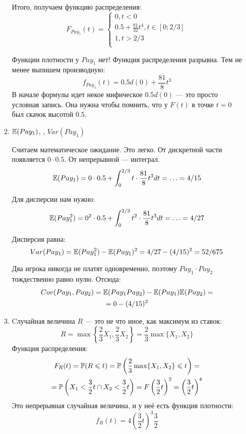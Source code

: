 \begin{enumerate}
\begin{enumerate}
Итого, получаем функцию распределения:
\begin{equation}
F_{Pay_{1}}(t)=
\begin{cases}
0, t<0 \\
0.5+\frac{81}{32}t^{4}, t\in [0;2/3] \\
1, t>2/3 \\
\end{cases}
\end{equation}

Функции плотности у $ Pay_{1} $ нет! Функция распределения разрывна. Тем не менее выпишем производную:
\begin{equation}
f_{Pay_{1}}(t)=0.5d(0)+\frac{81}{8}t^{3}
\end{equation}
В начале формулы идет некое мифическое $ 0.5d(0) $ — это просто условная запись. Она нужна чтобы помнить, что у  $ F(t) $ в точке $ t=0 $ был скачок высотой $ 0.5 $.


\item $ \E(Pay_{1}) $, , $ Var(Pay_{1}) $

Считаем математическое ожидание. Это легко. От дискретной части появляется $ 0\cdot 0.5 $. От непрерывной — интеграл.
\begin{equation}
\E(Pay_{1})=0\cdot 0.5+\int_{0}^{2/3}t\cdot \frac{81}{8}t^{3} dt=\ldots=4/15
\end{equation}

Для дисперсии нам нужно:
\begin{equation}
\E(Pay_{1}^{2})=0^{2}\cdot 0.5+\int_{0}^{2/3}t^{2}\cdot \frac{81}{8}t^{3} dt=\ldots=4/27
\end{equation}

Дисперсия равна:
\begin{equation}
Var(Pay_{1})=\E(Pay_{1}^{2})-\E(Pay_{1})^{2}=4/27-(4/15)^{2}=52/675
\end{equation}


Два игрока никогда не платят одновременно, поэтому $ Pay_{1}\cdot Pay_{2} $ тождественно равно нулю. Отсюда:
\begin{multline}
Cov(Pay_{1},Pay_{2})=\E(Pay_{1}Pay_{2})-\E(Pay_{1})\E(Pay_{2})=\\
=0-(4/15)^{2}
\end{multline}
\item Cлучайная величина $ R$ — это не что иное, как максимум из ставок:
\begin{equation}
R=\max\left\{ \frac{2}{3}X_{1},\frac{2}{3}X_{2} \right\}=\frac{2}{3}\max\{X_{1},X_{2}\}
\end{equation}
Функция распределения:
\begin{multline}
F_{R}(t)=\P(R\leq t)=\P\left(\frac{2}{3}\max\{X_{1},X_{2}\}\leq t\right)=\\
=\P\left(X_{1}<\frac{3}{2}t \cap X_{2}<\frac{3}{2}t\right)=F\left(\frac{3}{2}t\right)^{2}=\left(\frac{3}{2}t\right)^{4}
\end{multline}
Это непрерывная случайная величина, и у неё есть функция плотности:
\begin{equation}
f_{R}(t)=4\left(\frac{3}{2}t\right)^{3}\frac{3}{2}
\end{equation}


\end{enumerate}
\end{enumerate}

